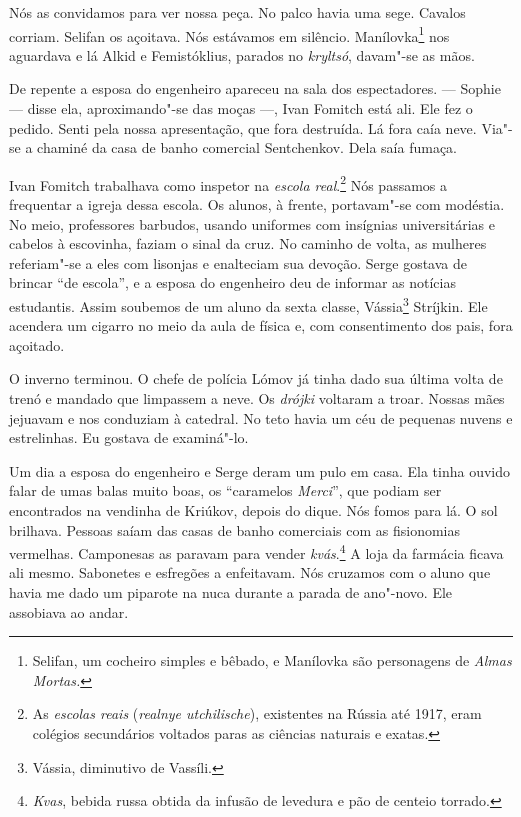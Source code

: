 Nós as convidamos para ver nossa peça. No palco havia uma sege. Cavalos
corriam. Selifan os açoitava. Nós estávamos em silêncio.
Manílovka\footnote{Selifan, um cocheiro simples e bêbado, e Manílovka
  são personagens de \emph{Almas Mortas. }} nos aguardava e lá Alkid e
Femistóklius, parados no \emph{kryltsó}, davam"-se as mãos.

De repente a esposa do engenheiro apareceu na sala dos espectadores. ---
Sophie --- disse ela, aproximando"-se das moças ---, Ivan Fomitch está
ali. Ele fez o pedido. Senti pela nossa apresentação, que fora
destruída. Lá fora caía neve. Via"-se a chaminé da casa de banho
comercial Sentchenkov. Dela saía fumaça.

Ivan Fomitch trabalhava como inspetor na \emph{escola real}.\footnote{As
  \emph{escolas reais} (\emph{realnye utchilische}), existentes na
  Rússia até 1917, eram colégios secundários voltados paras as ciências
  naturais e exatas.} Nós passamos a frequentar a igreja dessa escola.
Os alunos, à frente, portavam"-se com modéstia. No meio, professores
barbudos, usando uniformes com insígnias universitárias e cabelos à
escovinha, faziam o sinal da cruz. No caminho de volta, as mulheres
referiam"-se a eles com lisonjas e enalteciam sua devoção. Serge gostava
de brincar ``de escola'', e a esposa do engenheiro deu de informar as
notícias estudantis. Assim soubemos de um aluno da sexta classe,
Vássia\footnote{Vássia, diminutivo de Vassíli.} Stríjkin. Ele acendera
um cigarro no meio da aula de física e, com consentimento dos pais, fora
açoitado.

O inverno terminou. O chefe de polícia Lómov já tinha dado sua última
volta de trenó e mandado que limpassem a neve. Os \emph{drójki} voltaram
a troar. Nossas mães jejuavam e nos conduziam à catedral. No teto havia
um céu de pequenas nuvens e estrelinhas. Eu gostava de examiná"-lo.

Um dia a esposa do engenheiro e Serge deram um pulo em casa. Ela tinha
ouvido falar de umas balas muito boas, os ``caramelos \emph{Merci}'',
que podiam ser encontrados na vendinha de Kriúkov, depois do dique. Nós
fomos para lá. O sol brilhava. Pessoas saíam das casas de banho
comerciais com as fisionomias vermelhas. Camponesas as paravam para
vender \emph{kvás}.\footnote{\emph{Kvas}, bebida russa obtida da infusão
  de levedura e pão de centeio torrado.} A loja da farmácia ficava ali
mesmo. Sabonetes e esfregões a enfeitavam. Nós cruzamos com o aluno que
havia me dado um piparote na nuca durante a parada de ano"-novo. Ele
assobiava ao andar.

